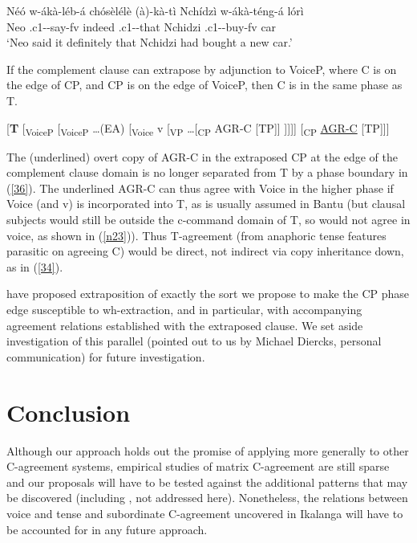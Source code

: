 \documentclass[output=paper,
modfonts
]{langscibook}
\begin{document}
\ea \label{35}
	\gll Néó w-ákà-léb-á chósèlélè (à)-kà-tì Nchídzì w-ákà-téng-á lórì  \\
	Neo .c1--say-fv indeed .c1--that Nchidzi .c1--buy-fv 	car	\\
	\glt `Neo said it definitely that Nchidzi had bought a new car.'\z

If the complement clause can extrapose by adjunction to VoiceP, where C is on the edge of CP, and CP is on the edge of VoiceP, then C is in the same phase as T.

\ea \label{36} \textup{[\textbf{T } [\textsubscript{VoiceP} [\textsubscript{VoiceP} …(EA) [\textsubscript{Voice} v [\textsubscript{VP} …}[\textsubscript{CP} AGR-C [TP]] { }\textup{]]]]} [\textsubscript{CP} \underline{AGR-C} [TP]]\textup{]} \z


The (underlined) overt copy of AGR-C in the extraposed CP at the edge of the complement clause domain is no longer separated from T by a phase boundary in (\ref{36}). The underlined AGR-C can thus agree with Voice in the higher phase if Voice (and v) is incorporated into T, as is usually assumed in Bantu (but clausal subjects would still be outside the c-command domain of T, so would not agree in voice, as shown in (\ref{n23})). Thus T-agreement (from anaphoric tense features parasitic on agreeing C) would be direct, not indirect via copy inheritance down, as in (\ref{34}). 

\citet{Rackowski2005} have proposed extraposition of exactly the sort we propose to make the CP phase edge susceptible to wh-extraction, and in particular, with accompanying agreement relations established with the extraposed clause. We set aside investigation of this parallel (pointed out to us by Michael Diercks, personal communication) for future investigation.


\section{Conclusion}

Although our approach holds out the promise of applying more generally to other  C-agreement systems, empirical studies of matrix C-agreement are still sparse and our proposals will have to be tested against the additional patterns that may be discovered (including \citealt{Diercks2017},  not addressed here). Nonetheless, the relations between voice and tense and subordinate C-agreement uncovered in Ikalanga will have to be accounted for in any future approach.
\end{document}
